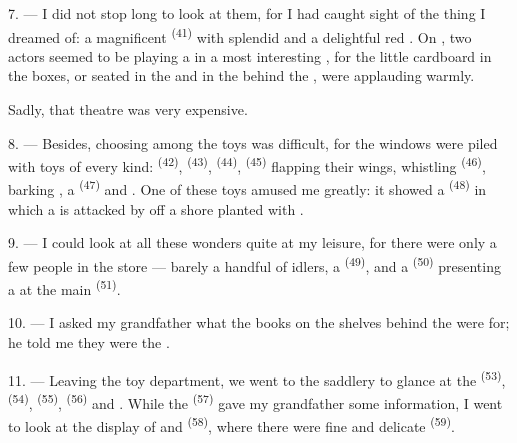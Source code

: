 7. --- I did not stop long to look at them, for I had caught sight of the
thing I dreamed of: a magnificent  \textsuperscript{(41)} with
splendid  and a delightful red . On
, two actors seemed to be playing a  in a most
interesting , for the little cardboard  in the
boxes, or seated in the  and in the  behind the
, were applauding warmly.

Sadly, that theatre was very expensive.

8. --- Besides, choosing among the toys was difficult, for the windows were
piled with toys of every kind:  \textsuperscript{(42)},
 \textsuperscript{(43)},  \textsuperscript{(44)}, 
\textsuperscript{(45)} flapping their wings, whistling 
\textsuperscript{(46)}, barking , a  \textsuperscript{(47)} and
. One of these toys amused me greatly: it showed a
 \textsuperscript{(48)} in which a  is attacked by
 off a shore planted with .


9. --- I could look at all these wonders quite at my leisure, for there
were only a few people in the store --- barely a handful of idlers, a
 \textsuperscript{(49)}, and a  \textsuperscript{(50)} presenting
a  at the main  \textsuperscript{(51)}.

10. --- I asked my grandfather what the books on the shelves behind the
 were for; he told me they were the .

\VUsaut{3.6mm}
\VUsaut{2.8mm}

11. --- Leaving the toy department, we went to the saddlery to glance at
the  \textsuperscript{(53)},  \textsuperscript{(54)},
 \textsuperscript{(55)},  \textsuperscript{(56)} and
. While the  \textsuperscript{(57)} gave
my grandfather some information, I went to look at the display of
 and  \textsuperscript{(58)}, where there were fine
 and delicate  \textsuperscript{(59)}.

